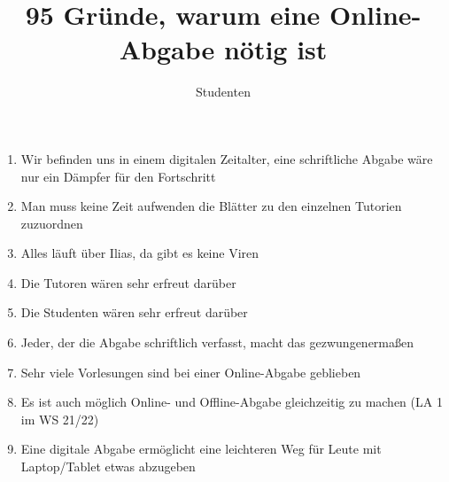 \documentclass[a4paper]{article}
\title{95 Gründe, warum eine Online-Abgabe nötig ist}
\author{Studenten}
\begin{document}
\begin{enumerate}

	\item Wir befinden uns in einem digitalen Zeitalter, eine schriftliche Abgabe wäre nur ein Dämpfer für den Fortschritt
	\item Man muss keine Zeit aufwenden die Blätter zu den einzelnen Tutorien zuzuordnen
	\item Alles läuft über Ilias, da gibt es keine Viren
	\item Die Tutoren wären sehr erfreut darüber
	\item Die Studenten wären sehr erfreut darüber
	\item Jeder, der die Abgabe schriftlich verfasst, macht das gezwungenermaßen
	\item Sehr viele Vorlesungen sind bei einer Online-Abgabe geblieben
	\item Es ist auch möglich Online- und Offline-Abgabe gleichzeitig zu machen (LA 1 im WS 21/22)
	\item Eine digitale Abgabe ermöglicht eine leichteren Weg für Leute mit Laptop/Tablet etwas abzugeben
\end{enumerate}
\end{document}
